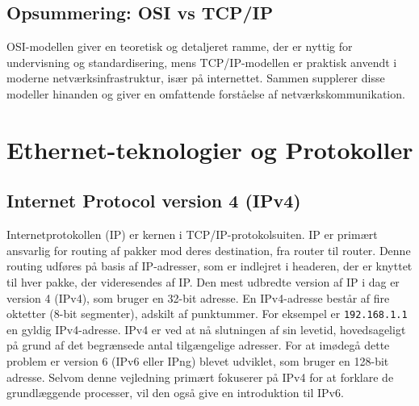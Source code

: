 \section{Opsummering: OSI vs TCP/IP}
OSI-modellen giver en teoretisk og detaljeret ramme, der er nyttig for undervisning og standardisering, mens TCP/IP-modellen er praktisk anvendt i moderne netværksinfrastruktur, især på internettet. Sammen supplerer disse modeller hinanden og giver en omfattende forståelse af netværkskommunikation.

\chapter{ Ethernet-teknologier og Protokoller}
\section{Internet Protocol version 4 (IPv4)}
Internetprotokollen (IP) er kernen i TCP/IP-protokolsuiten. IP er primært ansvarlig for routing af pakker mod deres destination, fra router til router. Denne routing udføres på basis af IP-adresser, som er indlejret i headeren, der er knyttet til hver pakke, der videresendes af IP.
\newline\newline\noindent 
Den mest udbredte version af IP i dag er version 4 (IPv4), som bruger en 32-bit adresse. En IPv4-adresse består af fire oktetter (8-bit segmenter), adskilt af punktummer. For eksempel er \texttt{192.168.1.1} en gyldig IPv4-adresse.
\newline\newline\noindent 
IPv4 er ved at nå slutningen af sin levetid, hovedsageligt på grund af det begrænsede antal tilgængelige adresser. For at imødegå dette problem er version 6 (IPv6 eller IPng) blevet udviklet, som bruger en 128-bit adresse. Selvom denne vejledning primært fokuserer på IPv4 for at forklare de grundlæggende processer, vil den også give en introduktion til IPv6.


